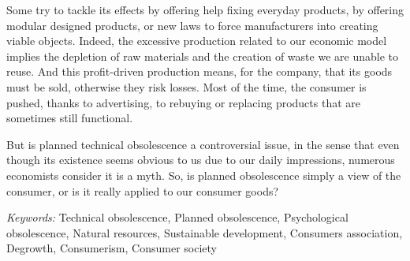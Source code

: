 Some try to tackle its effects by offering help fixing everyday products, by offering modular designed products, or new laws to force manufacturers into creating viable objects. Indeed, the excessive production related to our economic model implies the depletion of raw materials and the creation of waste we are unable to reuse. And this profit-driven production means, for the company, that its goods must be sold, otherwise they risk losses. Most of the time, the consumer is pushed, thanks to advertising, to rebuying or replacing products that are sometimes still functional.

But is planned technical obsolescence a controversial issue, in the sense that even though its existence seems obvious to us due to our daily impressions, numerous economists consider it is a myth. So, is planned obsolescence simply a view of the consumer, or is it really applied to our consumer goods?

\emph{Keywords:} Technical obsolescence, Planned obsolescence, Psychological obsolescence, Natural resources, Sustainable development, Consumers association, Degrowth, Consumerism, Consumer society